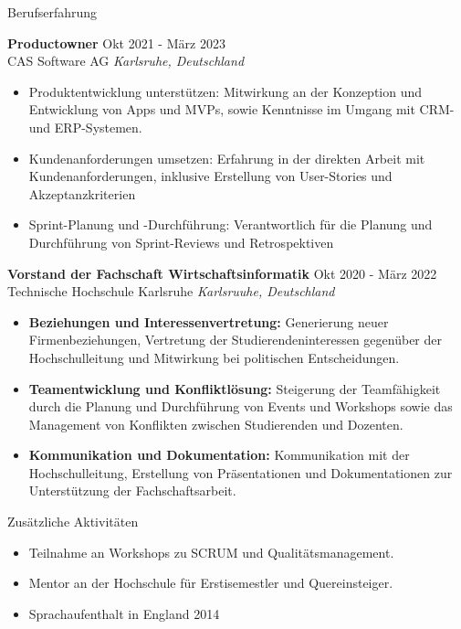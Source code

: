 \documentclass{resume} %
\begin{document}

\begin{rSection}{Berufserfahrung}

    \textbf{Productowner} \hfill Okt 2021 - März 2023\\
    CAS Software AG \hfill \textit{Karlsruhe, Deutschland}
    \begin{itemize}
        \itemsep -3pt {}
        \item \raggedright{Produktentwicklung unterstützen: Mitwirkung an der Konzeption und Entwicklung von Apps und MVPs, sowie Kenntnisse im Umgang mit CRM- und ERP-Systemen.}
        \item \raggedright{Kundenanforderungen umsetzen: Erfahrung in der direkten Arbeit mit Kundenanforderungen, inklusive Erstellung von User-Stories und Akzeptanzkriterien}
        \item \raggedright{Sprint-Planung und -Durchführung: Verantwortlich für die Planung und Durchführung von Sprint-Reviews und Retrospektiven}
    \end{itemize}

    \textbf{Vorstand der Fachschaft Wirtschaftsinformatik} \hfill Okt 2020 - März 2022\\
    Technische Hochschule Karlsruhe \hfill \textit{Karlsruuhe, Deutschland}
    \begin{itemize}
        \itemsep -3pt {}
        \item \raggedright{\textbf{Beziehungen und Interessenvertretung:} Generierung neuer Firmenbeziehungen, Vertretung der Studierendeninteressen gegenüber der Hochschulleitung und Mitwirkung bei politischen Entscheidungen.}
        \item \raggedright{\textbf{Teamentwicklung und Konfliktlösung:} Steigerung der Teamfähigkeit durch die Planung und Durchführung von Events und Workshops sowie das Management von Konflikten zwischen Studierenden und Dozenten.} 
        \item \raggedright{\textbf{Kommunikation und Dokumentation:} Kommunikation mit der Hochschulleitung, Erstellung von Präsentationen und Dokumentationen zur Unterstützung der Fachschaftsarbeit.}
    \end{itemize}
\end{rSection}

\begin{rSection}{Zusätzliche Aktivitäten}
    \begin{itemize}
        \item 	Teilnahme an Workshops zu SCRUM und Qualitätsmanagement.
        \item	Mentor an der Hochschule für Erstisemestler und Quereinsteiger.
        \item   Sprachaufenthalt in England 2014
    \end{itemize}


\end{rSection}
\end{document}
